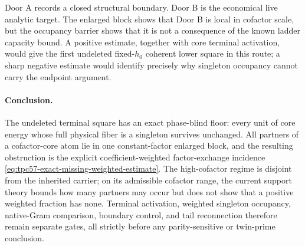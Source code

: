 Door A records a closed structural boundary.  Door B is the economical live
analytic target.  The enlarged block shows that Door B is local in cofactor
scale, but the occupancy barrier shows that it is not a consequence of the
known ladder capacity bound.  A positive
estimate, together with core terminal activation, would give the first
undeleted fixed-\(h_0\) coherent lower square in this route; a sharp
negative estimate would identify precisely why singleton occupancy cannot
carry the endpoint argument.

\paragraph{Conclusion.}
The undeleted terminal square has an exact phase-blind floor: every unit of
core energy whose full physical fiber is a singleton survives unchanged.
All partners of a cofactor-core atom lie in one constant-factor enlarged
block, and the resulting obstruction is the explicit coefficient-weighted
factor-exchange incidence
\eqref{eq:tpc57-exact-missing-weighted-estimate}.  The high-cofactor regime
is disjoint from the inherited carrier; on its admissible cofactor range,
the current support theory bounds how many partners may occur but does not
show that a positive weighted fraction has none.  Terminal activation,
weighted singleton occupancy,
native-Gram comparison, boundary control, and tail reconnection therefore
remain separate gates, all strictly before any parity-sensitive or
twin-prime conclusion.
